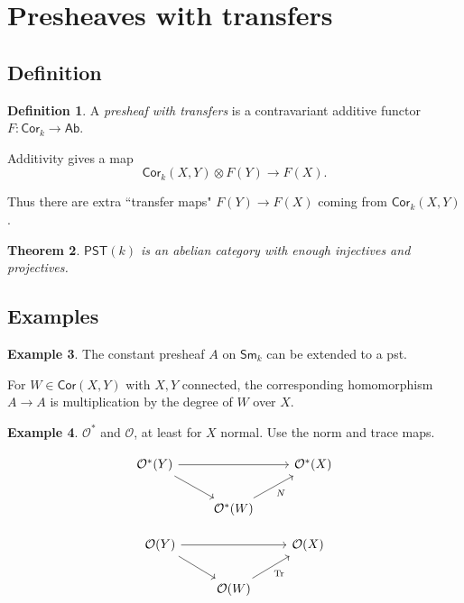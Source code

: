 \documentclass[leqno, openany]{memoir}
\newtheorem{thm}{Theorem}[section]
\theoremstyle{definition}
\newtheorem{defn}[thm]{Definition}
\newtheorem{exm}[thm]{Example}
\theoremstyle{remark}
\theoremstyle{plain}
\theoremstyle{definition}
\theoremstyle{remark}
\newcommand{\mc}[1]{\mathcal{#1}}
\newcommand{\ms}[1]{\mathsf{#1}}
\newcommand{\Sm}{\mathsf{Sm}}
\newcommand{\Cor}{\mathsf{Cor}}
\begin{document}
\section{Presheaves with transfers} \subsection{Definition} \begin{defn} A
\textit{presheaf with transfers} is a contravariant additive functor
$F:\Cor_k\rightarrow\ms{Ab}$.  \end{defn} 

Additivity gives a map \[ \Cor_k(X, Y)\otimes F(Y)\rightarrow F(X).  \]

Thus there are extra ``transfer maps" $F(Y)\rightarrow F(X)$ coming from
$\Cor_k(X, Y)$. 

\begin{thm} $\ms{PST}(k)$ is an abelian category with enough injectives and
projectives.  \end{thm}

\subsection{Examples}

\begin{exm} The constant presheaf $A$ on $\Sm_k$ can be extended to a pst.  

For $W\in \Cor(X, Y)$ with $X, Y$ connected, the corresponding homomorphism
$A\rightarrow A$ is multiplication by the degree of $W$ over $X$.  \end{exm}

\begin{exm} $\mc{O}^*$ and $\mc{O}$, at least for $X$ normal.  Use the norm and
    trace maps. 

\[\begin{tikzcd} {\mc{O}^*(Y)} && {\mc{O}^*(X)} \\ & {\mc{O}^*(W)}
\arrow[from=1-1, to=1-3] \arrow[from=1-1, to=2-2] \arrow["N"', from=2-2,
to=1-3] \end{tikzcd}\]

\[\begin{tikzcd} {\mc{O}(Y)} && {\mc{O}(X)} \\ & {\mc{O}(W)} \arrow[from=1-1,
to=1-3] \arrow[from=1-1, to=2-2] \arrow["\Tr"', from=2-2, to=1-3]
\end{tikzcd}\] \end{exm}
\end{document}
